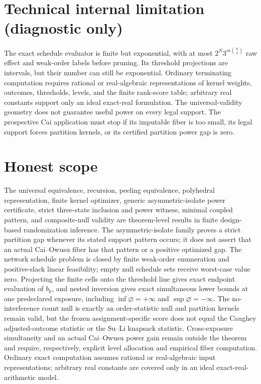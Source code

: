 \documentclass{article}
\begin{document}
\section*{Technical internal limitation (diagnostic only)}

The exact schedule evaluator is finite but exponential, with at most \(2^N3^{m\binom N2}\) raw effect and weak-order labels before pruning. Its threshold projections are intervals, but their number can still be exponential. Ordinary terminating computation requires rational or real-algebraic representations of kernel weights, outcomes, thresholds, levels, and the finite rank-score table; arbitrary real constants support only an ideal exact-real formulation. The universal-validity geometry does not guarantee useful power on every legal support. The prospective Cai application must stop if its imputable fiber is too small, its legal support forces partition kernels, or its certified partition power gap is zero.

\section{Honest scope}

The universal equivalence, recursion, peeling equivalence, polyhedral representation, finite kernel optimizer, generic asymmetric-isolate power certificate, strict three-state inclusion and power witness, minimal coupled pattern, and composite-null validity are theorem-level results in finite design-based randomization inference. The asymmetric-isolate family proves a strict partition gap whenever its stated support pattern occurs; it does not assert that an actual Cai--Owusu fiber has that pattern or a positive optimized gap. The network schedule problem is closed by finite weak-order enumeration and positive-slack linear feasibility; empty null schedule sets receive worst-case value zero. Projecting the finite cells onto the threshold line gives exact endpoint evaluation of \(b_k\), and nested inversion gives exact simultaneous lower bounds at one predeclared exposure, including \(\inf\varnothing=+\infty\) and \(\sup\varnothing=-\infty\). The no-interference count null is exactly an order-statistic null and partition kernels remain valid, but the frozen assignment-specific score does not equal the Caughey adjusted-outcome statistic or the Su--Li knapsack statistic. Cross-exposure simultaneity and an actual Cai--Owusu power gain remain outside the theorem and require, respectively, explicit level allocation and empirical fiber computation. Ordinary exact computation assumes rational or real-algebraic input representations; arbitrary real constants are covered only in an ideal exact-real-arithmetic model.
\end{document}
